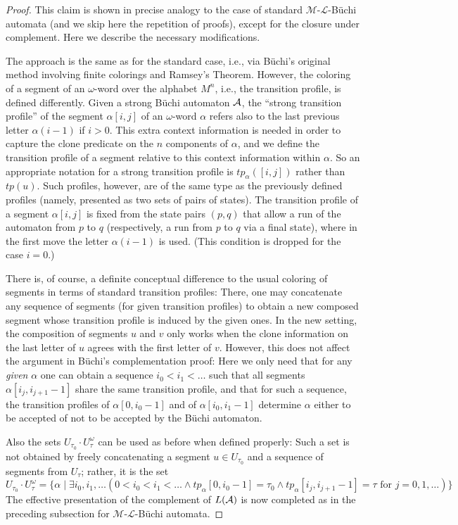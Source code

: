 \documentclass[copyright,creativecommons]{eptcs}
\theoremstyle{plain}
\theoremstyle{nonumberplain}
\newtheorem{proof}{Proof}
\newcommand{\m}{\ensuremath{\mathcal{M}}}
\newcommand{\el}{\ensuremath{\mathcal{L}}}
\newcommand{\ml}{\ensuremath{\m\textrm{-}\el}}
\newcommand{\tp}{\ensuremath{\mathit{tp}}}
\begin{document}
\begin{proof}
This claim is shown in precise analogy to the case of standard 
$\m$-$\el$-B\"uchi automata (and we skip here the repetition of proofs), 
except for the closure under complement. Here we describe the necessary 
modifications. 

The approach is the same as for the standard case, 
i.e., via B\"uchi's original method involving finite colorings and 
Ramsey's Theorem. However, the coloring of a segment of an 
$\omega$-word over the alphabet $M^n$, i.e., the transition profile, is 
defined differently. Given a strong B\"uchi automaton ${\cal A}$, 
the ``strong transition profile'' 
of the segment $\alpha[i,j]$ 
of an $\omega$-word $\alpha$ refers also to the 
last previous letter $\alpha(i-1)$ if $i > 0$. This extra context 
information is needed in order to capture the clone predicate on the 
$n$ components of $\alpha$, and we define the transition profile of a segment 
relative to this context information within $\alpha$. So an appropriate 
notation for a strong transition profile is $\tp_\alpha([i,j])$ rather than 
$\tp(u)$. Such profiles, however, are of the same type as the previously 
defined profiles (namely, presented as two sets of pairs of states). The
transition profile of a segment $\alpha[i,j]$ is fixed from the 
state pairs $(p,q)$ that allow a run of the automaton from $p$ to $q$ 
(respectively, a run from $p$ to $q$ via a final state), where   
in the first move the letter $\alpha(i-1)$ is used. (This condition 
is dropped for the case $i=0$.) 

There is, of course, a definite conceptual difference to the usual 
coloring of segments in terms of standard transition profiles: 
There, one may concatenate any sequence of segments (for given transition 
profiles) to obtain a new composed segment whose transition profile 
is induced by the given ones. In the new setting, the composition 
of segments $u$ and $v$ only works when the clone information on 
the last letter of $u$ agrees with the first letter of $v$. However, 
this does not affect the argument in B\"uchi's complementation proof: 
Here we only need that for any {\em given} $\alpha$ one can obtain 
a sequence $i_0 <  i_1 <  \ldots$ such that all segments 
$\alpha[i_j,i_{j+1} -1]$ share the same transition profile, 
and that for such a sequence, the transition profiles of 
$\alpha[0, i_0 -1]$ and of $\alpha[i_0, i_1 - 1]$ determine 
$\alpha$ either to be accepted of not to be accepted by 
the B\"uchi automaton.  

Also the sets $U_{\tau_0} \cdot U_\tau^\omega$ can be used as before
when defined properly:  
Such a set is {not} obtained by freely concatenating 
a segment $u \in U_{\tau_0}$ and a sequence of segments from $U_\tau$; 
rather, it is the set 
$$U_{\tau_0} \cdot U_\tau^\omega = \{\alpha \mid \exists i_0, i_1, \ldots (0 < i_0 < i_1 < \ldots \wedge 
\tp_\alpha[0,i_0-1] = \tau_0 \wedge  \tp_\alpha[i_j, i_{j+1}-1] = \tau \text{ for }j= 0,1, \ldots)\}$$
The effective presentation of the complement of $L({\cal A})$ is now completed
as in the preceding subsection for \ml-B\"uchi automata.  
\end{proof}
\end{document}
